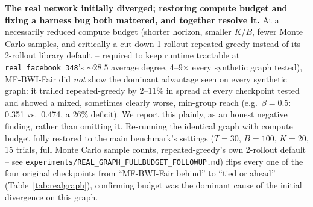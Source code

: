 \documentclass[journal]{IEEEtran}
\begin{document}
\textbf{The real network initially diverged; restoring compute budget and
fixing a harness bug both mattered, and together resolve it.} At a
necessarily reduced compute budget (shorter horizon, smaller $K$/$B$,
fewer Monte Carlo samples, and critically a cut-down 1-rollout
repeated-greedy instead of its 2-rollout library default -- required to
keep runtime tractable at \texttt{real\_facebook\_348}'s $\sim\!28.5$
average degree, 4--9$\times$ every synthetic graph tested), MF-BWI-Fair
did \emph{not} show the dominant advantage seen on every synthetic graph:
it trailed repeated-greedy by 2--11\% in spread at every checkpoint tested
and showed a mixed, sometimes clearly worse, min-group reach (e.g.\
$\beta=0.5$: 0.351 vs.\ 0.474, a 26\% deficit). We report this plainly,
as an honest negative finding, rather than omitting it. Re-running the
identical graph with compute budget fully restored to the main
benchmark's settings ($T=30$, $B=100$, $K=20$, 15 trials, full Monte
Carlo sample counts, repeated-greedy's own 2-rollout default -- see
\texttt{experiments/\allowbreak REAL\_GRAPH\_FULLBUDGET\_\allowbreak FOLLOWUP.md})
flips every one of the four original checkpoints from ``MF-BWI-Fair
behind'' to ``tied or ahead'' (Table~\ref{tab:realgraph}), confirming
budget was the dominant cause of the initial divergence on this graph.
\end{document}
